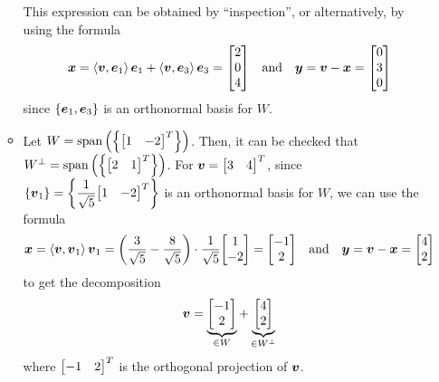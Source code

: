 \begin{enumerate}
\begin{itemize}
This expression can be obtained by ``inspection'', or alternatively, by using
the formula
\[
\vect{x}=\inner{\vect{v}}{\vect{e}_1}\vect{e}_1+\inner{\vect{v}}{\vect{e}_3}\vect{e}_3
=\mqty[2\\ 0\\ 4]
\qqtext{and}
\vect{y}=\vect{v}-\vect{x}=\mqty[0\\ 3\\0 ]
\]
since \(\{\vb*{e}_1,\vb*{e}_3\}\) is an orthonormal basis for \(W\).
\item Let \(W=\spn{\qty{\mqty[1&-2]^{T}}}\). Then, it can be checked that
\(W^{\perp}=\spn{\qty{\mqty[2&1]^{T}}}\). For \(\vect{v}=\mqty[3& 4]^{T}\),
since \(\displaystyle \{\vect{v}_1\}=\qty{\frac{1}{\sqrt{5}}\mqty[1&-2]^{T}}\) is an orthonormal
basis for \(W\), we can use the formula
\[
\vect{x}=\inner{\vect{v}}{\vect{v}_1}\vect{v}_1
=\qty(\frac{3}{\sqrt{5}}-\frac{8}{\sqrt{5}})\cdot \frac{1}{\sqrt{5}}\mqty[1\\ -2]
=\mqty[-1\\ 2]
\qqtext{and}
\vect{y}=\vect{v}-\vect{x}=\mqty[4\\ 2]
\]
to get the decomposition
\[
\vect{v}=\underbrace{\mqty[-1\\ 2]}_{\in W}+\underbrace{\mqty[4\\ 2]}_{\in W^{\perp}}
\]
where \(\mqty[-1&2]^{T}\) is the orthogonal projection of \(\vb*{v}\).
\begin{center}
\end{center}
\end{itemize}
\end{enumerate}
